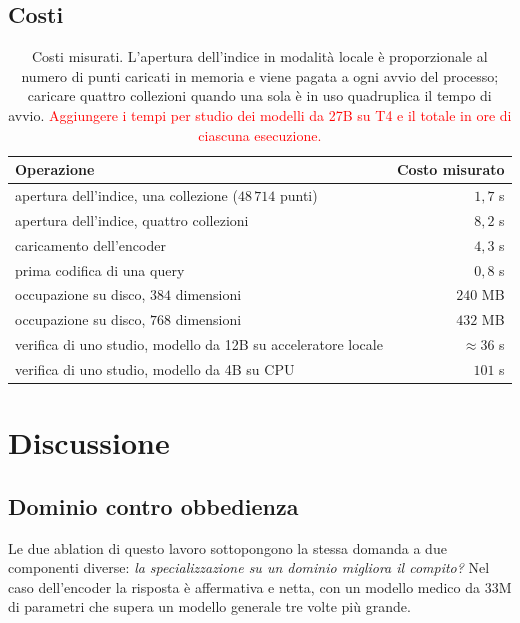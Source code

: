 \documentclass[pdflatex,sn-mathphys-num]{sn-jnl}
\theoremstyle{thmstyleone}
\theoremstyle{thmstyletwo}
\theoremstyle{thmstylethree}
\newcommand{\ev}[1]{\textcolor{red}{#1}}
\begin{document}
\subsection{Costi}\label{sec:res-costi}

\begin{table}[H]
\centering
\begin{tabular}{lr}
\toprule
Operazione & Costo misurato \\
\midrule
apertura dell'indice, una collezione ($48\,714$ punti) & $1{,}7$ s \\
apertura dell'indice, quattro collezioni               & $8{,}2$ s \\
caricamento dell'encoder                               & $4{,}3$ s \\
prima codifica di una query                            & $0{,}8$ s \\
occupazione su disco, $384$ dimensioni                 & $240$ MB \\
occupazione su disco, $768$ dimensioni                 & $432$ MB \\
verifica di uno studio, modello da 12B su acceleratore locale & $\approx 36$ s \\
verifica di uno studio, modello da 4B su CPU           & $101$ s \\
\bottomrule
\end{tabular}
\caption{Costi misurati. L'apertura dell'indice in modalità locale è proporzionale al numero di punti caricati in memoria e viene pagata a ogni avvio del processo; caricare quattro collezioni quando una sola è in uso quadruplica il tempo di avvio. \ev{Aggiungere i tempi per studio dei modelli da 27B su T4 e il totale in ore di ciascuna esecuzione.}}
\label{tab:costi}
\end{table}

\section{Discussione}\label{sec:discussione}

\subsection{Dominio contro obbedienza}\label{sec:disc-dominio}

Le due ablation di questo lavoro sottopongono la stessa domanda a due componenti diverse: \emph{la specializzazione su un dominio migliora il compito?} Nel caso dell'encoder la risposta è affermativa e netta, con un modello medico da $33$M di parametri che supera un modello generale tre volte più grande.
\end{document}
